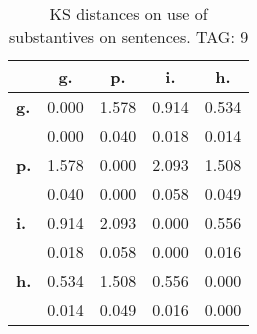 \begin{table}[h!]
\begin{center}
\begin{tabular}{| l || c | c | c | c |}\hline
 & {\bf g.} & {\bf p.} & {\bf i.} & {\bf h.} \\\hline\hline
{\bf g.} & 0.000 & 1.578 & 0.914 & 0.534 \\
{\bf } & 0.000 & 0.040 & 0.018 & 0.014 \\\hline
{\bf p.} & 1.578 & 0.000 & 2.093 & 1.508 \\
{\bf } & 0.040 & 0.000 & 0.058 & 0.049 \\\hline
{\bf i.} & 0.914 & 2.093 & 0.000 & 0.556 \\
{\bf } & 0.018 & 0.058 & 0.000 & 0.016 \\\hline
{\bf h.} & 0.534 & 1.508 & 0.556 & 0.000 \\
{\bf } & 0.014 & 0.049 & 0.016 & 0.000 \\\hline
\end{tabular}
\caption{KS distances on use of substantives on sentences. TAG: 9}
\end{center}
\end{table}
